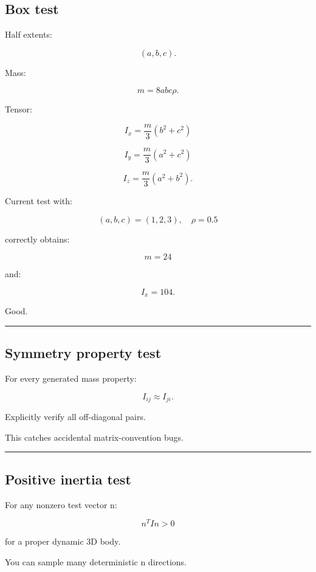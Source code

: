 \subsection{Box test}\label{06-engine-ii-ch039-box-test}

Half extents:

\[
(a,b,c).
\]

Mass:

\[
m=8abc\rho.
\]

Tensor:

\[
I_x
=
\frac m3(b^2+c^2)
\]

\[
I_y
=
\frac m3(a^2+c^2)
\]

\[
I_z
=
\frac m3(a^2+b^2).
\]

Current test with:

\[
(a,b,c)=(1,2,3),
\quad
\rho=0.5
\]

correctly obtains:

\[
m=24
\]

and:

\[
I_x=104.
\]

Good.

\begin{center}\rule{0.5\linewidth}{0.5pt}\end{center}

\subsection{Symmetry property test}\label{06-engine-ii-ch039-symmetry-property-test}

For every generated mass property:

\[
\boxed{
I_{ij}\approx I_{ji}.
}
\]

Explicitly verify all off-diagonal pairs.

This catches accidental matrix-convention bugs.

\begin{center}\rule{0.5\linewidth}{0.5pt}\end{center}

\subsection{Positive inertia test}\label{06-engine-ii-ch039-positive-inertia-test}

For any nonzero test vector n:

\[
\boxed{
n^TIn>0
}
\]

for a proper dynamic 3D body.

You can sample many deterministic n directions.

